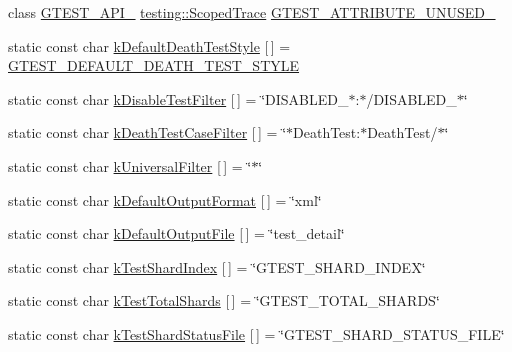 \begin{DoxyCompactItemize}
\item 
class \mbox{\hyperlink{gtest-port_8h_aa73be6f0ba4a7456180a94904ce17790}{G\+T\+E\+S\+T\+\_\+\+A\+P\+I\+\_\+}} \mbox{\hyperlink{classtesting_1_1ScopedTrace}{testing\+::\+Scoped\+Trace}} \mbox{\hyperlink{namespacetesting_aa09221196f0a830d5bf1c63ffce69dc3}{G\+T\+E\+S\+T\+\_\+\+A\+T\+T\+R\+I\+B\+U\+T\+E\+\_\+\+U\+N\+U\+S\+E\+D\+\_\+}}
\item 
static const char \mbox{\hyperlink{namespacetesting_a317291240e750e2142a23cbd52bc5aec}{k\+Default\+Death\+Test\+Style}} \mbox{[}$\,$\mbox{]} = \mbox{\hyperlink{gtest-port_8h_a491d09ee62f1c9cfeafa3dbf75aaa9e2}{G\+T\+E\+S\+T\+\_\+\+D\+E\+F\+A\+U\+L\+T\+\_\+\+D\+E\+A\+T\+H\+\_\+\+T\+E\+S\+T\+\_\+\+S\+T\+Y\+LE}}
\item 
static const char \mbox{\hyperlink{namespacetesting_a0a2a3239fb038e7ce83195d89941872d}{k\+Disable\+Test\+Filter}} \mbox{[}$\,$\mbox{]} = \char`\"{}D\+I\+S\+A\+B\+L\+E\+D\+\_\+$\ast$\+:$\ast$/D\+I\+S\+A\+B\+L\+E\+D\+\_\+$\ast$\char`\"{}
\item 
static const char \mbox{\hyperlink{namespacetesting_a23c33f4bfcc3c2e5e620eff31a98892d}{k\+Death\+Test\+Case\+Filter}} \mbox{[}$\,$\mbox{]} = \char`\"{}$\ast$Death\+Test\+:$\ast$Death\+Test/$\ast$\char`\"{}
\item 
static const char \mbox{\hyperlink{namespacetesting_a236f8612e4b148d8d989a311a30a4557}{k\+Universal\+Filter}} \mbox{[}$\,$\mbox{]} = \char`\"{}$\ast$\char`\"{}
\item 
static const char \mbox{\hyperlink{namespacetesting_a93f6911eea5572ee2133ac92032f7425}{k\+Default\+Output\+Format}} \mbox{[}$\,$\mbox{]} = \char`\"{}xml\char`\"{}
\item 
static const char \mbox{\hyperlink{namespacetesting_aa5a002b5bb3784c830b1c99aa2688f27}{k\+Default\+Output\+File}} \mbox{[}$\,$\mbox{]} = \char`\"{}test\+\_\+detail\char`\"{}
\item 
static const char \mbox{\hyperlink{namespacetesting_a5f76dfdb8cb2664da54e320ecaba3643}{k\+Test\+Shard\+Index}} \mbox{[}$\,$\mbox{]} = \char`\"{}G\+T\+E\+S\+T\+\_\+\+S\+H\+A\+R\+D\+\_\+\+I\+N\+D\+EX\char`\"{}
\item 
static const char \mbox{\hyperlink{namespacetesting_a7542311baba200ebabd4065717606f6e}{k\+Test\+Total\+Shards}} \mbox{[}$\,$\mbox{]} = \char`\"{}G\+T\+E\+S\+T\+\_\+\+T\+O\+T\+A\+L\+\_\+\+S\+H\+A\+R\+DS\char`\"{}
\item 
static const char \mbox{\hyperlink{namespacetesting_a57d3eeb1e968b4f1efc4787b2d39fbfa}{k\+Test\+Shard\+Status\+File}} \mbox{[}$\,$\mbox{]} = \char`\"{}G\+T\+E\+S\+T\+\_\+\+S\+H\+A\+R\+D\+\_\+\+S\+T\+A\+T\+U\+S\+\_\+\+F\+I\+LE\char`\"{}

\end{DoxyCompactItemize}
